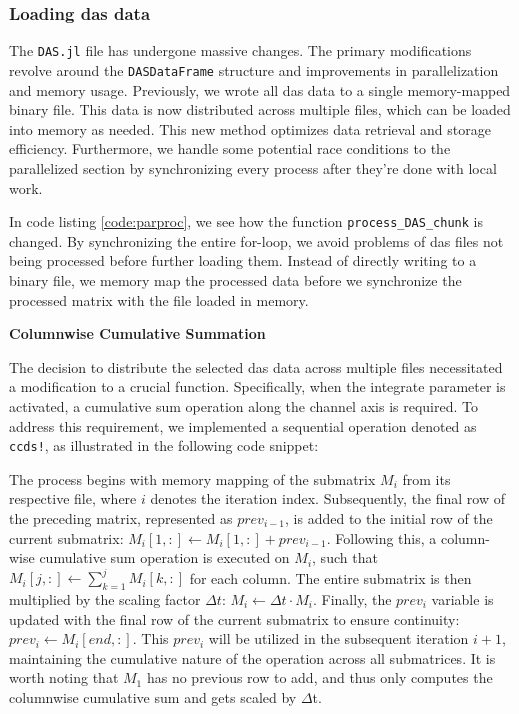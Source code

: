\subsubsection{Loading \acrshort{das} data}

The \texttt{DAS.jl} file has undergone massive changes. The primary modifications revolve around the \texttt{DASDataFrame} structure and improvements in parallelization and memory usage. Previously, we wrote all \acrshort{das} data to a single memory-mapped binary file. This data is now distributed across multiple files, which can be loaded into memory as needed. This new method optimizes data retrieval and storage efficiency. Furthermore, we handle some potential race conditions to the parallelized section by synchronizing every process after they're done with local work. 



In code listing \ref{code:parproc}, we see how the function \texttt{process\_DAS\_chunk} is changed. By synchronizing the entire for-loop, we avoid problems of \acrshort{das} files not being processed before further loading them. Instead of directly writing to a binary file, we memory map the processed data before we synchronize the processed matrix with the file loaded in memory.

\textbf{Columnwise Cumulative Summation}

The decision to distribute the selected \acrshort{das} data across multiple files necessitated a modification to a crucial function. Specifically, when the integrate parameter is activated, a cumulative sum operation along the channel axis is required. To address this requirement, we implemented a sequential operation denoted as \texttt{ccds!}, as illustrated in the following code snippet:



The process begins with memory mapping of the submatrix $M_i$ from its respective file, where $i$ denotes the iteration index. Subsequently, the final row of the preceding matrix, represented as $prev_{i-1}$, is added to the initial row of the current submatrix: $M_i[1,:] \leftarrow M_i[1,:] + prev_{i-1}$. Following this, a column-wise cumulative sum operation is executed on $M_i$, such that $M_i[j,:] \leftarrow \sum_{k=1}^j M_i[k,:]$ for each column. The entire submatrix is then multiplied by the scaling factor $\Delta t$: $M_i \leftarrow \Delta t \cdot M_i$. Finally, the $prev_i$ variable is updated with the final row of the current submatrix to ensure continuity: $prev_i \leftarrow M_i[end,:]$. This $prev_i$ will be utilized in the subsequent iteration $i+1$, maintaining the cumulative nature of the operation across all submatrices. It is worth noting that $M_1$ has no previous row to add, and thus only computes the columnwise cumulative sum and gets scaled by $\Delta$t.

